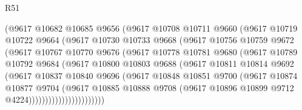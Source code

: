 \begin{lexlean}{R51}
\begin{coremodule}
                    (@9617
                      @10682
                      @10685
                      @9656
                      (@9617
                        @10708
                        @10711
                        @9660
                        (@9617
                          @10719
                          @10722
                          @9664
                          (@9617
                            @10730
                            @10733
                            @9668
                            (@9617
                              @10756
                              @10759
                              @9672
                              (@9617
                                @10767
                                @10770
                                @9676
                                (@9617
                                  @10778
                                  @10781
                                  @9680
                                  (@9617
                                    @10789
                                    @10792
                                    @9684
                                    (@9617
                                      @10800
                                      @10803
                                      @9688
                                      (@9617
                                        @10811
                                        @10814
                                        @9692
                                        (@9617
                                          @10837
                                          @10840
                                          @9696
                                          (@9617
                                            @10848
                                            @10851
                                            @9700
                                            (@9617
                                              @10874
                                              @10877
                                              @9704
                                              (@9617
                                                @10885
                                                @10888
                                                @9708
                                                (@9617
                                                  @10896
                                                  @10899
                                                  @9712
                                                  @4224)))))))))))))))))))))))

\end{coremodule}
\end{lexlean}
